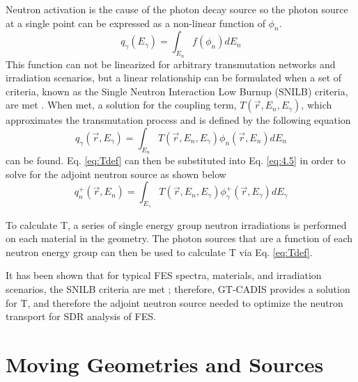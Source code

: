 Neutron activation is the cause of the photon decay source so the photon 
source at a single point can be
expressed as a non-linear function of $\phi_n$. 
\begin{equation} \label{eq:4.8}
	q_{\gamma}(E_{\gamma}) = \int_{E_n} f(\phi_{n}) dE_{n}
\end{equation}
This function can not be linearized for arbitrary transmutation networks
and irradiation scenarios, but a linear relationship can
be formulated when a set of criteria, known as the Single Neutron Interaction
Low Burnup (SNILB) criteria, are met \cite{gtcadis}.
When met, a solution for the coupling term, 
$T(\overrightarrow{r}, E_{n}, E_{\gamma})$, which approximates the
 transmutation process and is defined by the following equation
\begin{equation} \label{eq:Tdef}
	q_{\gamma}(\overrightarrow{r}, E_{\gamma}) = 
	\int_{E_n}T(\overrightarrow{r}, E_{n}, E_{\gamma})
	\phi_{n}(\overrightarrow{r}, E_{n}) dE_{n}
\end{equation}
can be found.
Eq. \ref{eq:Tdef} can then be substituted into Eq. \ref{eq:4.5} in order to 
solve for the adjoint neutron source as shown below
\begin{equation} \label{eq:gt_adj_nsrc}
	q_{n}^{+}(\overrightarrow{r},E_{n})
	= \int_{E_{\gamma}}T(\overrightarrow{r}, E_{n}, E_{\gamma})
	\phi_{\gamma}^{+}(\overrightarrow{r}, E_{\gamma}) dE_{\gamma}
\end{equation}

To calculate T, a series of single energy group neutron irradiations is 
performed on each material in the geometry.  
The photon sources that are a function of each neutron energy group 
can then be used to calculate T via Eq. \ref{eq:Tdef}.

It has been shown that for typical FES spectra, materials, and irradiation
scenarios, the SNILB criteria are met \cite{gtcadis}; therefore, GT-CADIS provides a solution
for T, and therefore the adjoint neutron source needed to optimize the neutron
transport for SDR analysis of FES.


\section{Moving Geometries and Sources} \label{sec:moving_sys}

